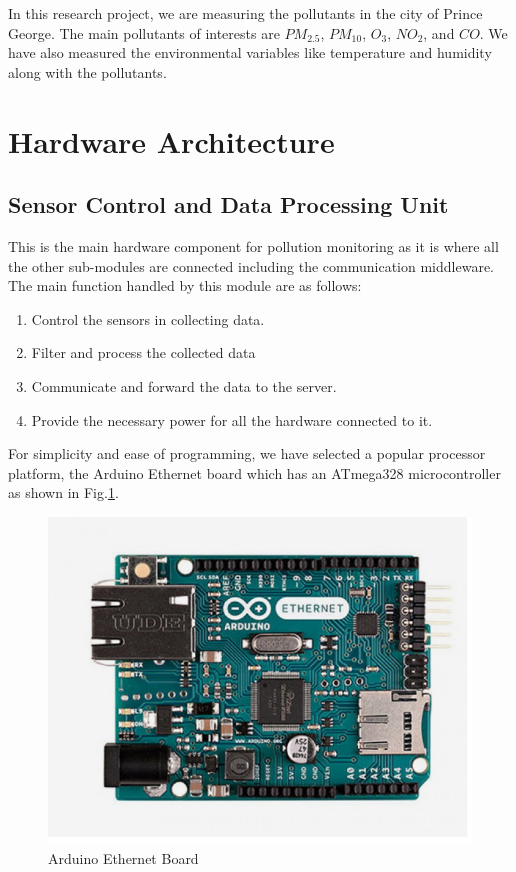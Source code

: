     In this research project, we are measuring the pollutants in the city of Prince George. The main pollutants of interests are  $PM_{2.5}$, $PM_{10}$, $O_3$, $NO_2$, and $CO$. We have also measured the environmental variables like temperature and humidity along with the pollutants. 

 \section{Hardware Architecture}
  
\subsection{Sensor Control and Data Processing Unit}

This is the main hardware component for pollution monitoring as it is where all the other sub-modules are connected including the communication middleware. The main function handled by this module are as follows:

\begin{enumerate}

\item Control the sensors in collecting data.
\item Filter and process the collected data 
\item Communicate and forward the data to the server.
\item Provide the necessary power for all the hardware connected to it.

\end{enumerate}
For simplicity and ease of programming, we have selected a popular processor platform, the Arduino Ethernet board which has an ATmega328 microcontroller as shown in Fig.\ref{Arduino}. 

\begin{figure}[h]
  \begin{center}
  \includegraphics[scale=0.70]{./images/figure3.png}
  \end{center}
  \caption{Arduino Ethernet Board}
  \label{Arduino}
\end{figure}

